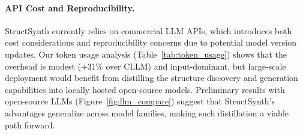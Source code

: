 \paragraph{API Cost and Reproducibility.}
StructSynth currently relies on commercial LLM APIs, which introduces both cost considerations and reproducibility concerns due to potential model version updates. Our token usage analysis (Table~\ref{tab:token_usage}) shows that the overhead is modest (+31\% over CLLM) and input-dominant, but large-scale deployment would benefit from distilling the structure discovery and generation capabilities into locally hosted open-source models. Preliminary results with open-source LLMs (Figure~\ref{fig:llm_compare}) suggest that StructSynth's advantages generalize across model families, making such distillation a viable path forward.

